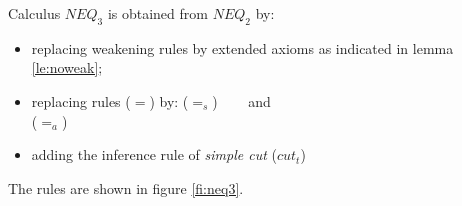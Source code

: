 \begin{DEFINITION} Calculus $NEQ_3$ is obtained from $NEQ_2$ by:
\begin{itemize}\MyLPar
\item replacing weakening rules by extended axioms as indicated in lemma \ref{le:noweak};
\item replacing rules  ($=$) by:
 ($=_{s}$)
\label{ru:K12s} \ \ \ 
and \\
 ($=_{a}$)
\label{ru:K12a} 
\item adding the inference rule of {\em simple cut}
 ($cut_t$)\label{ru:sicut}
%
\end{itemize}
\end{DEFINITION}
\noindent
The rules are shown in figure \ref{fi:neq3}.

